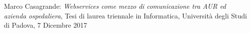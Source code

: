 \documentclass[a4paper]{article}
\begin{document}
\newpage

\vspace*{\fill}

\begin{center}
	\large{Marco Casagrande: \textit{Webservices come mezzo di comunicazione tra AUR ed azienda ospedaliera}, Tesi di laurea triennale in Informatica, Università degli Studi di Padova, 7 Dicembre 2017}
\end{center}

\newpage

\vspace*{\fill}

\newpage

\listoffigures

\listoftables

\newpage

\tableofcontents

\newpage
\end{document}

